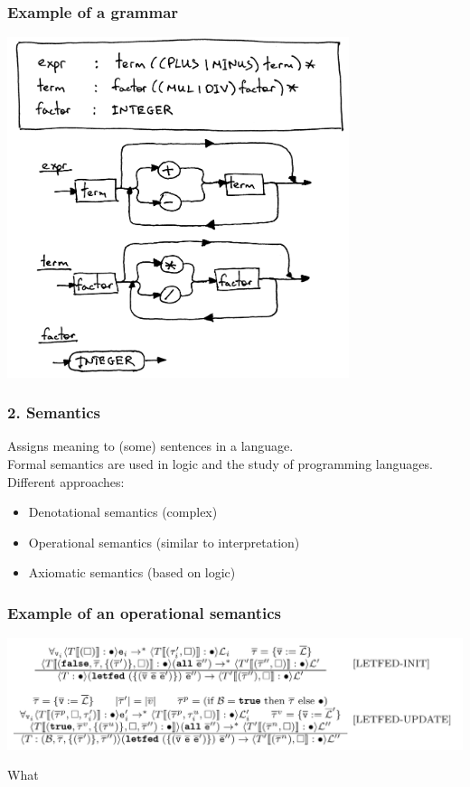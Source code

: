 \documentclass[14pt]{beamer}
\begin{document}
\begin{frame}
  \frametitle{Example of a grammar}

  \begin{center}
    \includegraphics[width=0.75\textwidth]{pictures/grammar.png}
  \end{center}
\end{frame}


\begin{frame}
  \frametitle{2. Semantics}
  Assigns \textcolor{hgvs}{meaning} to (some) sentences in a language.\\[2em]

  Formal semantics are used in logic and the study of programming
  languages.\\[2em]

  Different approaches:
  \begin{itemize}
    \item Denotational semantics (complex)
    \item Operational semantics (similar to interpretation)
    \item Axiomatic semantics (based on logic)
  \end{itemize}
\end{frame}


\begin{frame}
  \frametitle{Example of an operational semantics}
  \begin{center}
    \includegraphics[width=1.1\textwidth]{pictures/semantics.png}
  \end{center}

  \pause
  What\textinterrobang
\end{frame}
\end{document}
